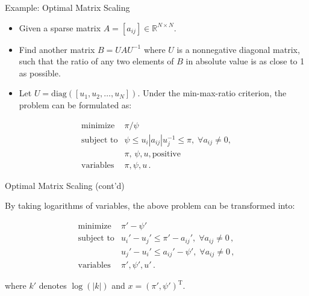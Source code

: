 \documentclass[10pt,ignorenonframetext,serif,onlymath]{beamer}
\begin{document}
\begin{frame}{Example: Optimal Matrix Scaling}
\protect\hypertarget{sec:example-optimal-matrix-scaling}{}

\begin{itemize}
\item
  Given a sparse matrix \(A = [a_{ij}] \in \mathbb{R}^{N\times N}\).
\item
  Find another matrix \(B = U A U^{-1}\) where \(U\) is a nonnegative
  diagonal matrix, such that the ratio of any two elements of \(B\) in
  absolute value is as close to 1 as possible.
\item
  Let \(U = \mathrm{diag}([u_1, u_2, \ldots, u_N])\). Under the
  min-max-ratio criterion, the problem can be formulated as:
\end{itemize}

\[\begin{array}{ll}
  \text{minimize}   &   \pi/\psi  \\
  \text{subject to} &   \psi \leq u_i |a_{ij}| u_j^{-1} \leq \pi, \; \forall a_{ij} \neq 0 , \\
                    &   \pi, \, \psi, u, \text{positive} \\
  \text{variables}  &   \pi, \psi, u \, .
  \end{array}\]

\end{frame}

\begin{frame}{Optimal Matrix Scaling (cont’d)}
\protect\hypertarget{sec:optimal-matrix-scaling-contd}{}

By taking logarithms of variables, the above problem can be transformed
into:

\[\begin{array}{ll}
  \text{minimize}   &   \pi' - \psi'  \\
  \text{subject to} &   u_i' -  u_j'  \leq \pi' - a_{ij}', \; \forall a_{ij} \neq 0 \,, \\
                    &   u_j' -  u_i' \leq a_{ij}' - \psi', \; \forall a_{ij} \neq 0 \,, \\
  \text{variables}  &   \pi', \psi', u' \, .
  \end{array}\]

where \(k'\) denotes \(\log( | k | )\) and
\(x = (\pi', \psi' )^{ \mathrm{ T } }\).

\end{frame}
\end{document}
